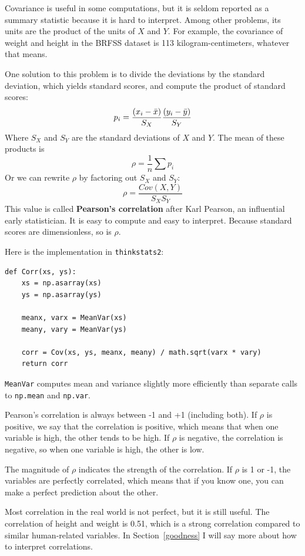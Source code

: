 \documentclass[12pt]{book}
\begin{document}
Covariance is useful in some computations, but it is seldom reported
as a summary statistic because it is hard to interpret.  Among other
problems, its units are the product of the units of $X$ and $Y$.  For
example, the covariance of weight and height in the BRFSS dataset is
113 kilogram-centimeters, whatever that means.

One solution to this problem is to divide the deviations by the standard
deviation, which yields standard scores, and compute the product of
standard scores:
%
\[ p_i = \frac{(x_i - \bar{x})}{S_X} \frac{(y_i - \bar{y})}{S_Y} \]
%
Where $S_X$ and $S_Y$ are the standard deviations of $X$ and $Y$.
The mean of these products is
%
\[ \rho = \frac{1}{n} \sum p_i \]
%
Or we can rewrite $\rho$ by factoring out $S_X$ and
$S_Y$:
%
\[ \rho = \frac{Cov(X,Y)}{S_X S_Y} \]
%
This value is called {\bf Pearson's correlation} after Karl Pearson,
an influential early statistician.  It is easy to compute and easy to
interpret.  Because standard scores are dimensionless, so is $\rho$.

Here is the implementation in {\tt thinkstats2}:

\begin{verbatim}
def Corr(xs, ys):
    xs = np.asarray(xs)
    ys = np.asarray(ys)

    meanx, varx = MeanVar(xs)
    meany, vary = MeanVar(ys)

    corr = Cov(xs, ys, meanx, meany) / math.sqrt(varx * vary)
    return corr
\end{verbatim}

{\tt MeanVar} computes mean and variance slightly more efficiently
than separate calls to {\tt np.mean} and {\tt np.var}.

Pearson's correlation is always between -1 and +1 (including both).
If $\rho$ is positive, we say that the correlation is positive,
which means that when one variable is high, the other tends to be
high.  If $\rho$ is negative, the correlation is negative, so
when one variable is high, the other is low.

The magnitude of $\rho$ indicates the strength of the correlation.  If
$\rho$ is 1 or -1, the variables are perfectly correlated, which means
that if you know one, you can make a perfect prediction about the
other.  

Most correlation in the real world is not perfect, but it is still
useful.  The correlation of height and weight is 0.51, which is a
strong correlation compared to similar human-related variables.  In
Section~\ref{goodness} I will say more about how to interpret
correlations.
\end{document}
